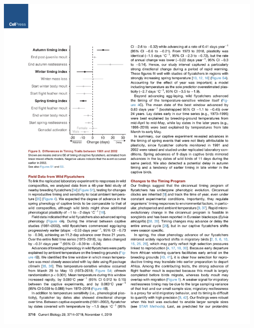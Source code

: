 \documentclass[a4paper, twoside]{templates/ociamthesis}
\begin{document}
\begin{center}\includegraphics[width=1\linewidth]{pdf_chapters/pied/pied_crop_Part03} \end{center}
\end{document}
